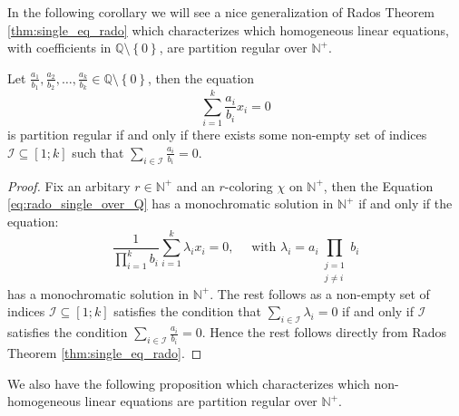 In the following corollary we will see a nice generalization of Rados Theorem \ref{thm:single_eq_rado} which characterizes which homogeneous linear equations, with coefficients in $\mathbb{Q} \setminus \left\{0\right\}$, are partition regular over $\mathbb{N}^{+}$.

\begin{corollary}
	Let $\frac{a_1}{b_{1}}, \frac{a_{2}}{b_{2}}, \ldots, \frac{a_{k}}{b_{k}} \in \mathbb{Q} \setminus \left\{0\right\}$, then the equation
	\begin{equation}\label{eq:rado_single_over_Q}
		\sum_{i = 1}^{k} \frac{a_{i}}{b_{i}}x_i = 0
	\end{equation}
	is partition regular if and only if there exists some non-empty set of indices $\mathcal{I} \subseteq [1; k]$ such that $\sum_{i \in \mathcal{I}} \frac{a_{i}}{b_{i}} = 0$.
\end{corollary}
\begin{proof}
	Fix an arbitary $r \in \mathbb{N}^{+}$ and an $r$-coloring $\chi$ on $\mathbb{N}^{+}$, then the
	Equation \eqref{eq:rado_single_over_Q} has a monochromatic solution in $\mathbb{N}^{+}$ if and only if the equation:
	\begin{equation}
		\frac{1}{\prod_{i = 1}^k b_{i}} \sum_{i = 1}^k \lambda_{i} x_{i} = 0, \quad \text{ with } \lambda_i = a_i \prod_{\substack{j = 1 \\ j \neq i}} b_i
	\end{equation}
	has a monochromatic solution in $\mathbb{N}^{+}$. The rest follows as a non-empty set of indices $\mathcal{I} \subseteq [1; k]$ satisfies the condition that $\sum_{i \in \mathcal{I}} \lambda_{i} = 0$ if and only if $\mathcal{I}$ satisfies the condition $\sum_{i \in \mathcal{I}} \frac{a_{i}}{b_{i}} = 0$. %
	Hence the rest follows directly from Rados Theorem \ref{thm:single_eq_rado}.
\end{proof}

We also have the following proposition which characterizes which non-homogeneous linear equations are partition regular over $\mathbb{N}^{+}$.

